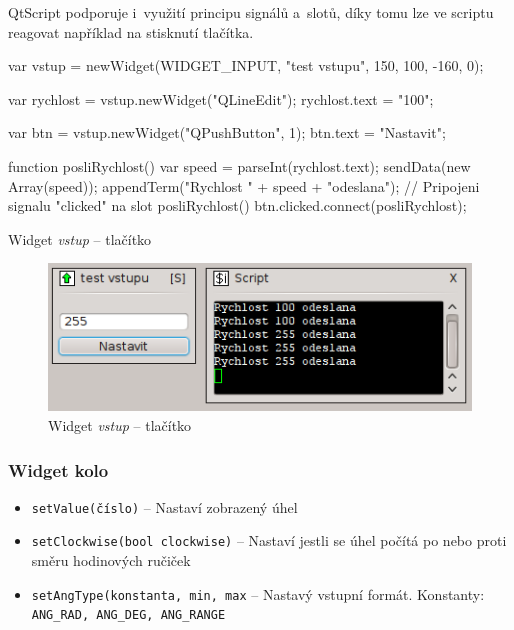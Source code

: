 \documentclass[12pt, a4paper, oneside]{article}
\newcommand{\It}{\textit}  %
\begin{document}
\newpage
QtScript podporuje i~využití principu signálů a~slotů, díky tomu lze ve scriptu reagovat například na stisknutí tlačítka.

\begin{listing}[H]
\begin{jscode}
var vstup = newWidget(WIDGET_INPUT,
                "test vstupu", 150, 100, -160, 0);

var rychlost = vstup.newWidget("QLineEdit");
rychlost.text = "100";

var btn = vstup.newWidget("QPushButton", 1);
btn.text = "Nastavit";

function posliRychlost() {
    var speed = parseInt(rychlost.text);
    sendData(new Array(speed));
    appendTerm("Rychlost " + speed + "odeslana\n");
}
// Pripojeni signalu "clicked" na slot posliRychlost()
btn.clicked.connect(posliRychlost);
\end{jscode}
\caption{Widget \It{vstup} -- tlačítko}
\end{listing}

\begin{figure}[H]
\begin{center}
\includegraphics{img/ref_input2.png}
\caption{Widget \It{vstup} -- tlačítko}
\end{center}
\end{figure}

\subsubsection*{Widget kolo}
\begin{itemize}
    \item {\color{blue}\verb/setValue(číslo)/} -- Nastaví zobrazený úhel
    \item {\color{blue}\verb/setClockwise(bool clockwise)/} -- Nastaví jestli se úhel počítá po nebo proti směru hodinových ručiček
    \item {\color{blue}\verb/setAngType(konstanta, min, max/} -- Nastavý vstupní formát. Konstanty:
\verb|ANG_RAD, ANG_DEG, ANG_RANGE|
\end{itemize}
\end{document}
